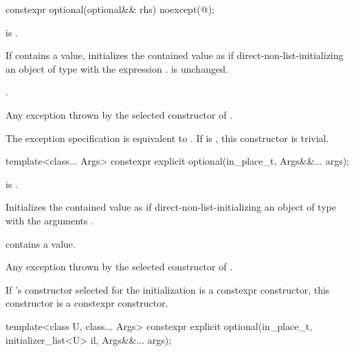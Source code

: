 %
\begin{itemdecl}
constexpr optional(optional&& rhs) noexcept(@\seebelow@);
\end{itemdecl}

\begin{itemdescr}
\pnum
\constraints
{} is .

\pnum
\effects
If  contains a value, initializes the contained value as if
direct-non-list-initializing an object of type  with the expression .
 is unchanged.

\pnum
\ensures
{}.

\pnum
\throws
Any exception thrown by the selected constructor of .

\pnum
\remarks
The exception specification is equivalent to
.
If  is ,
this constructor is trivial.
\end{itemdescr}

%
\begin{itemdecl}
template<class... Args> constexpr explicit optional(in_place_t, Args&&... args);
\end{itemdecl}

\begin{itemdescr}
\pnum
\constraints
{} is .

\pnum
\effects
Initializes the contained value as if direct-non-list-initializing an object of type  with the arguments .

\pnum
\ensures
{} contains a value.

\pnum
\throws
Any exception thrown by the selected constructor of .

\pnum
\remarks
If 's constructor selected for the initialization is a constexpr constructor, this constructor is a constexpr constructor.
\end{itemdescr}

%
\begin{itemdecl}
template<class U, class... Args>
  constexpr explicit optional(in_place_t, initializer_list<U> il, Args&&... args);
\end{itemdecl}

